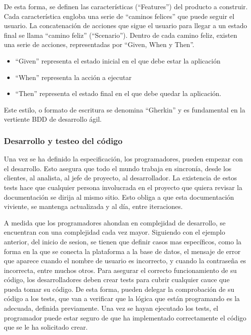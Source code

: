 \documentclass[12pt]{report} %
\begin{document}
De esta forma, se definen las características (``Features'') del producto a construir.
Cada característica engloba una serie de ``caminos felices'' que puede seguir el usuario.
La concatenación de acciones que sigue el usuario para llegar a un estado final se llama ``camino feliz'' (``Scenario'').
Dentro de cada camino feliz, existen una serie de acciones, representadas por ``Given, When y Then''.

\begin{itemize}
  \item{``Given'' representa el estado inicial en el que debe estar la aplicación}
  \item{``When'' representa la acción a ejecutar}
  \item{``Then'' representa el estado final en el que debe quedar la aplicación.}
\end{itemize}

Este estilo, o formato de escritura se denomina ``Gherkin'' y es fundamental en la vertiente BDD de desarrollo ágil.

\subsubsection{Desarrollo y testeo del código}

Una vez se ha definido la especificación, los programadores, pueden empezar con el desarrollo.
Esto asegura que todo el mundo trabaja en sincronía, desde los clientes, al analista, al jefe de proyecto, al desarrollador.
La existencia de estos tests hace que cualquier persona involucrada en el proyecto que quiera revisar la documentación se dirija al mismo sitio.
Esto obliga a que esta documentación viviente, se mantenga actualizada y al día, entre iteraciones.

A medida que los programadores ahondan en complejidad de desarrollo, se encuentran con una complejidad cada vez mayor.
Siguiendo con el ejemplo anterior, del inicio de sesion, se tienen que definir casos mas específicos, como la forma en la que se conecta la plataforma a la base de datos, el mensaje de error que aparece cuando el nombre de usuario es incorrecto, y cuando la contraseña es incorrecta, entre muchos otros.
Para asegurar el correcto funcionamiento de su código, los desarrolladores deben crear tests para cubrir cualquier cauce que pueda tomar su código.
De esta forma, pueden delegar la comprobación de su código a los tests, que van a verificar que la lógica que están programando es la adecuada, definida previamente.
Una vez se hayan ejecutado los tests, el programador puede estar seguro de que ha implementado correctamente el código que se le ha solicitado crear.
\end{document}
